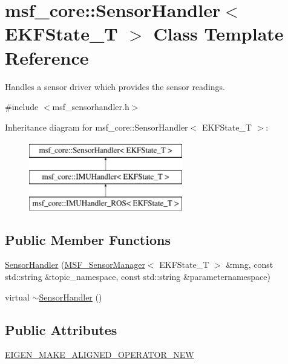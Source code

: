 \hypertarget{classmsf__core_1_1SensorHandler}{\section{msf\-\_\-core\-:\-:Sensor\-Handler$<$ E\-K\-F\-State\-\_\-\-T $>$ Class Template Reference}
\label{classmsf__core_1_1SensorHandler}
}


Handles a sensor driver which provides the sensor readings.  




{\ttfamily \#include $<$msf\-\_\-sensorhandler.\-h$>$}

Inheritance diagram for msf\-\_\-core\-:\-:Sensor\-Handler$<$ E\-K\-F\-State\-\_\-\-T $>$\-:\begin{figure}[H]
\begin{center}
\leavevmode
\includegraphics[height=3.000000cm]{classmsf__core_1_1SensorHandler}
\end{center}
\end{figure}
\subsection*{Public Member Functions}
\begin{DoxyCompactItemize}
\item 
\hyperlink{classmsf__core_1_1SensorHandler_aba1cd2f28ff92d5005ab7ad006e20023}{Sensor\-Handler} (\hyperlink{classmsf__core_1_1MSF__SensorManager}{M\-S\-F\-\_\-\-Sensor\-Manager}$<$ E\-K\-F\-State\-\_\-\-T $>$ \&mng, const std\-::string \&topic\-\_\-namespace, const std\-::string \&parameternamespace)
\item 
virtual \hyperlink{classmsf__core_1_1SensorHandler_a6f939c564fe67ed9ada1f93ebff2927c}{$\sim$\-Sensor\-Handler} ()
\end{DoxyCompactItemize}
\subsection*{Public Attributes}
\begin{DoxyCompactItemize}
\item 
\hyperlink{classmsf__core_1_1SensorHandler_ab25601f461c0c7e0e898f8eb200ec2b6}{E\-I\-G\-E\-N\-\_\-\-M\-A\-K\-E\-\_\-\-A\-L\-I\-G\-N\-E\-D\-\_\-\-O\-P\-E\-R\-A\-T\-O\-R\-\_\-\-N\-E\-W}
\end{DoxyCompactItemize}
